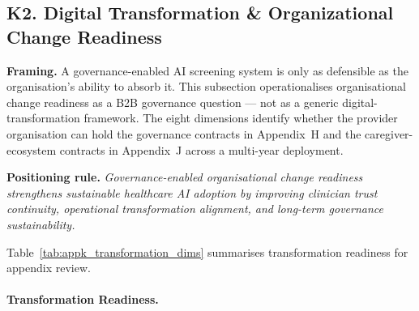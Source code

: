 \subsection*{K2. Digital Transformation \& Organizational Change Readiness}
\label{sec:appk_transformation}

\noindent\textbf{Framing.} A governance-enabled AI screening system is only as defensible as the organisation's ability to absorb it. This subsection operationalises organisational change readiness as a B2B governance question --- not as a generic digital-transformation framework. The eight dimensions identify whether the provider organisation can hold the governance contracts in Appendix~H and the caregiver-ecosystem contracts in Appendix~J across a multi-year deployment.

\noindent\textbf{Positioning rule.} \emph{Governance-enabled organisational change readiness strengthens sustainable healthcare AI adoption by improving clinician trust continuity, operational transformation alignment, and long-term governance sustainability.}

\noindent Table~\ref{tab:appk_transformation_dims} summarises transformation readiness for appendix review.

\paragraph{Transformation Readiness.}




